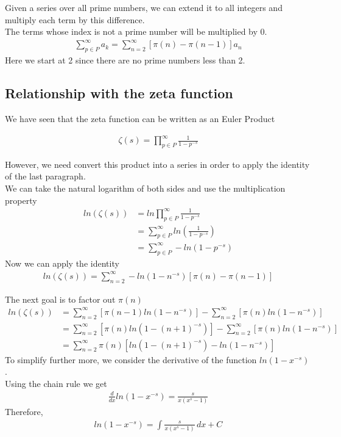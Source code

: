 \documentclass{article}
\begin{document}
Given a series over all prime numbers, we can extend it to all integers and multiply each term by this difference.
\\
The terms whose index is not a prime number will be multiplied by 0.
\begin{align*}
    \sum_{p\in P}^{\infty}a_k=\sum_{n=2}^{\infty}\left[\pi(n)-\pi(n-1)\right]a_n
\end{align*}
Here we start at 2 since there are no prime numbers less than 2.

\subsection{Relationship with the zeta function}

We have seen that the zeta function can be written as an Euler Product

\begin{align*}
    \zeta (s)=\prod_{p\in P}^{\infty}\frac{1}{1-p^{-s}}
\end{align*}

However, we need convert this product into a series in order to apply the identity of the last paragraph.
\\
We can take the natural logarithm of both sides and use the multiplication property
\begin{align*}
    ln\left(\zeta (s)\right)&=ln\prod_{p\in P}^{\infty}\frac{1}{1-p^{-s}}
    \\
    &=\sum_{p\in P}^{\infty}ln\left(\frac{1}{1-p^{-s}}\right)
    \\
    &=\sum_{p\in P}^{\infty}-ln\left(1-p^{-s}\right)
\end{align*}
Now we can apply the identity
\begin{align*}
    ln\left(\zeta (s)\right)=\sum_{n=2}^{\infty}-ln\left(1-n^{-s}\right)\left[\pi (n) - \pi (n-1)\right]
\end{align*}

The next goal is to factor out $\pi (n)$
\begin{align*}
    ln\left(\zeta(s)\right)
    &=\sum_{n=2}^{\infty}\left[\pi (n-1)ln\left(1-n^{-s}\right)\right]
    -\sum_{n=2}^{\infty}\left[\pi (n)ln\left(1-n^{-s}\right)\right]
    \\&=\sum_{n=2}^{\infty}\left[\pi (n)ln\left(1-(n+1)^{-s}\right)\right]
    -\sum_{n=2}^{\infty}\left[\pi (n)ln\left(1-n^{-s}\right)\right]
    \\
    &=\sum_{n=2}^{\infty}\pi (n)\left[ln\left(1-(n+1)^{-s}\right)-ln\left(1-n^{-s}\right)\right]
\end{align*}
To simplify further more, we consider the derivative of the function $ln(1-x^{-s})$.
\\
Using the chain rule we get
\begin{align*}
    \frac{d}{dx}ln(1-x^{-s})=
    \frac{s}{x(x^s-1)}
\end{align*}
Therefore,
\begin{align*}
    ln(1-x^{-s})=
    \int \frac{s}{x(x^s-1)}\,dx+C
\end{align*}
\end{document}
